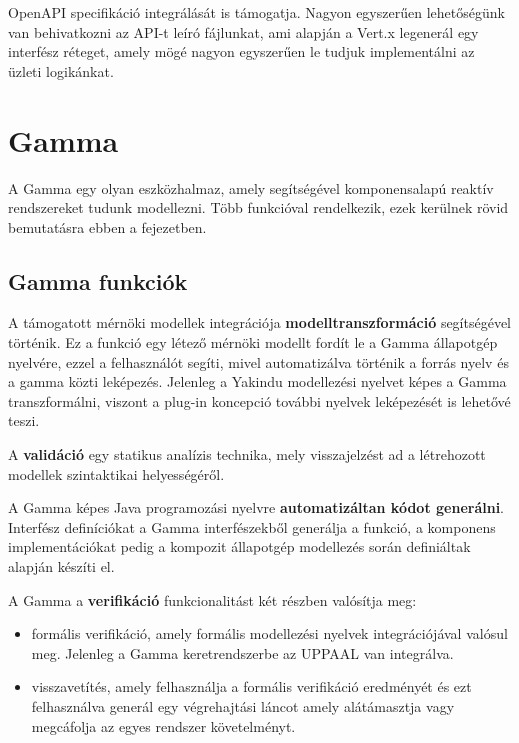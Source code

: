 OpenAPI specifikáció integrálását is támogatja. Nagyon egyszerűen lehetőségünk van behivatkozni az API-t leíró fájlunkat, ami alapján a Vert.x legenerál egy interfész réteget, amely mögé nagyon egyszerűen le tudjuk implementálni az üzleti logikánkat.
\section{Gamma}

A Gamma \cite{DBLP:journals/sosym/GraicsMVMV20}egy olyan eszközhalmaz, amely segítségével komponensalapú reaktív rendszereket tudunk modellezni. Több funkcióval rendelkezik, ezek kerülnek rövid bemutatásra ebben a fejezetben.
\subsection{Gamma funkciók}
A támogatott mérnöki modellek integrációja \textbf{modelltranszformáció}  segítségével történik. Ez a funkció egy létező mérnöki modellt fordít le a Gamma állapotgép nyelvére, ezzel a felhasználót segíti, mivel automatizálva történik a forrás nyelv és a gamma közti leképezés. Jelenleg a Yakindu modellezési nyelvet képes a Gamma transzformálni, viszont a plug-in koncepció további nyelvek leképezését is lehetővé teszi.

A \textbf{validáció} egy statikus analízis technika, mely visszajelzést ad a létrehozott modellek szintaktikai helyességéről.

A Gamma képes Java programozási nyelvre \textbf{automatizáltan kódot generálni}. Interfész definíciókat a Gamma interfészekből generálja a funkció, a komponens implementációkat pedig a kompozit állapotgép modellezés során definiáltak alapján készíti el.

A Gamma a \textbf{verifikáció} funkcionalitást két részben valósítja meg:
\begin{itemize}
	\item formális verifikáció, amely formális modellezési nyelvek integrációjával valósul meg. Jelenleg a Gamma keretrendszerbe az UPPAAL van integrálva.
	\item visszavetítés, amely felhasználja a formális verifikáció eredményét és ezt felhasználva  generál egy végrehajtási láncot amely alátámasztja vagy megcáfolja az egyes rendszer követelményt.
\end{itemize}

